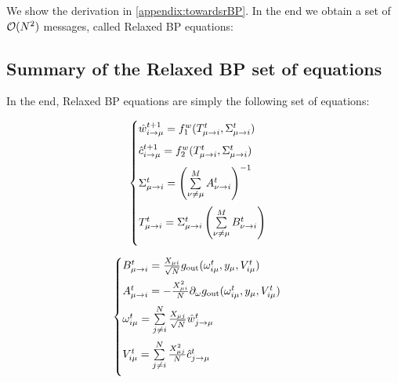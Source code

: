 \documentclass[aip,jmp,amsmath,amssymb,reprint]{revtex4}
\begin{document}
We show the derivation in \ref{appendix:towardsrBP}. In the end we obtain a set of $\mathcal{O}(N^2)$ messages, called Relaxed BP equations:

\subsection*{Summary of the Relaxed BP set of equations}
In the end, Relaxed BP equations are simply the following set of equations:\\
\begin{minipage}[c]{.46\linewidth}
\begin{equation}
	\begin{cases}
	\hat{w}_{i\to \mu}^{t+1} = f_1^w(T_{\mu \to i}^t,\Sigma_{\mu \to i}^t ) \vspace{0.2cm} \\
	\hat{c}_{i \to \mu}^{t+1} = f_2^w(T_{\mu \to i}^t, \Sigma_{\mu \to i}^t) \vspace{0.2cm} \\
	\Sigma_{\mu \to i}^t = \left( \sum\limits_{\nu \ne \mu}^M  A_{\nu \to i}^t \right )^{-1} \vspace{0.2cm} \\
	T_{\mu \to i}^t = \Sigma_{\mu \to i}^t  \left( \sum\limits_{\nu \ne \mu}^M  B_{\nu \to i}^t \right)\vspace{0.2cm} \\
	\end{cases}
\end{equation}
\end{minipage}
 \hfill
\begin{minipage}[c]{.46\linewidth}
\begin{equation}
	\begin{cases}
			B_{\mu \to i}^t =  \frac{X_{\mu i}}{\sqrt{N}} g_{\rm out} (\omega_{i\mu}^t, y_{\mu}, V_{i\mu}^t)\vspace{0.2cm}  \\
		A_{\mu \to i}^t = - \frac{X_{\mu i}^2}{N}  \partial_\omega g_{\rm out}(\omega_{i\mu}^t, y_{\mu}, V_{i\mu}^t)\vspace{0.2cm} \\
		\omega_{i\mu}^t = \sum\limits_{j\neq i}^N \frac{X_{\mu j}}{\sqrt{N}}   \hat{w}_{j\to \mu}^t\vspace{0.2cm} \\
		V_{i\mu}^t = \sum\limits_{j\neq i}^N \frac{X_{\mu j}^2}{N} \hat{c}_{j\to \mu}^t \vspace{0.2cm}
	\end{cases}\\
	\label{supp:relaxed_BP}
\end{equation}      
\end{minipage}
\end{document}
